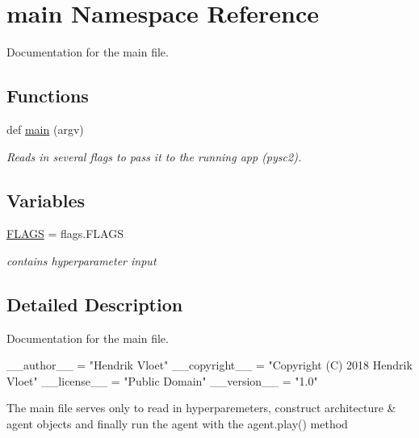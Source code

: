 \hypertarget{namespacemain}{}\section{main Namespace Reference}
\label{namespacemain}


Documentation for the main file.  


\subsection*{Functions}
\begin{DoxyCompactItemize}
\item 
def \mbox{\hyperlink{namespacemain_af3f5f1d2e9b06bf119f500dced42f536}{main}} (argv)
\begin{DoxyCompactList}\small\item\em Reads in several flags to pass it to the running app (pysc2). \end{DoxyCompactList}\end{DoxyCompactItemize}
\subsection*{Variables}
\begin{DoxyCompactItemize}
\item 
\mbox{\label{namespacemain_a9e54bf13f9d353cfeb8aa9a5623dcf87}} 
\mbox{\hyperlink{namespacemain_a9e54bf13f9d353cfeb8aa9a5623dcf87}{F\+L\+A\+GS}} = flags.\+F\+L\+A\+GS
\begin{DoxyCompactList}\small\item\em contains hyperparameter input \end{DoxyCompactList}\end{DoxyCompactItemize}


\subsection{Detailed Description}
Documentation for the main file. 

\begin{DoxyVerb}__author__ = "Hendrik Vloet"
__copyright__ = "Copyright (C) 2018 Hendrik Vloet"
__license__ = "Public Domain"
__version__ = "1.0"
\end{DoxyVerb}


The main file serves only to read in hyperparemeters, construct architecture \& agent objects and finally run the agent with the agent.\+play() method 

